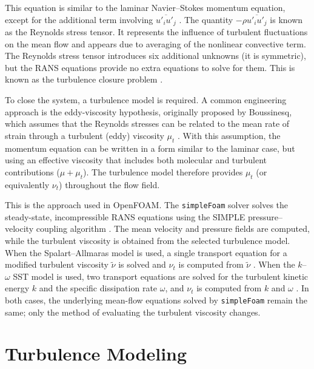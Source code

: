 This equation is similar to the laminar Navier--Stokes momentum equation, except for the additional term involving $\overline{u'_i u'_j}$ \cite{Pope2000TurbulentFlows,VersteegMalalasekera2007CFD}. The quantity $-\rho \overline{u'_i u'_j}$ is known as the Reynolds stress tensor. It represents the influence of turbulent fluctuations on the mean flow and appears due to averaging of the nonlinear convective term. The Reynolds stress tensor introduces six additional unknowns (it is symmetric), but the RANS equations provide no extra equations to solve for them. This is known as the turbulence closure problem \cite{Pope2000TurbulentFlows,Wilcox2006TurbulenceModeling}.

To close the system, a turbulence model is required. A common engineering approach is the eddy-viscosity hypothesis, originally proposed by Boussinesq, which assumes that the Reynolds stresses can be related to the mean rate of strain through a turbulent (eddy) viscosity $\mu_t$ \cite{VersteegMalalasekera2007CFD,Wilcox2006TurbulenceModeling}. With this assumption, the momentum equation can be written in a form similar to the laminar case, but using an effective viscosity that includes both molecular and turbulent contributions ($\mu+\mu_t$). The turbulence model therefore provides $\mu_t$ (or equivalently $\nu_t$) throughout the flow field.

This is the approach used in OpenFOAM. The \texttt{simpleFoam} solver solves the steady-state, incompressible RANS equations using the SIMPLE pressure--velocity coupling algorithm \cite{VersteegMalalasekera2007CFD}. The mean velocity and pressure fields are computed, while the turbulent viscosity is obtained from the selected turbulence model. When the Spalart--Allmaras model is used, a single transport equation for a modified turbulent viscosity $\tilde{\nu}$ is solved and $\nu_t$ is computed from $\tilde{\nu}$ \cite{SpalartAllmaras1992SA,SpalartAllmaras1994SAJournal}. When the $k$--$\omega$ SST model is used, two transport equations are solved for the turbulent kinetic energy $k$ and the specific dissipation rate $\omega$, and $\nu_t$ is computed from $k$ and $\omega$ \cite{Menter1994SST}. In both cases, the underlying mean-flow equations solved by \texttt{simpleFoam} remain the same; only the method of evaluating the turbulent viscosity changes.
\section{Turbulence Modeling}
\label{sec:turbulence_modeling}

